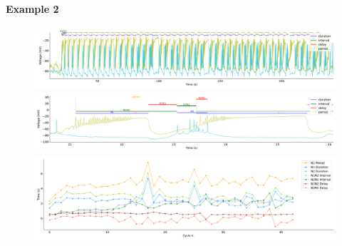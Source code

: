 \paragraph{\large{Example 2}}


\begin{figure}[htbp]
	\centering
	\begin{minipage}[b]{\textwidth}
		\centering
		\includegraphics[width=\textwidth,height=0.1\textheight]{./invariants/data/SUSSEX/CV1a_driven2/images/stim_cv1a2_signal_intervals_zoom.pdf}
		\includegraphics[width=\textwidth]{./invariants/data/SUSSEX/CV1a_driven2/images/stim_cv1a2_signal_intervals_cycle.pdf}
		\includegraphics[width=\textwidth]{./invariants/data/SUSSEX/CV1a_driven2/images/stim_cv1a2_time_cycle.pdf}
	\end{minipage}
	\centering
	\begin{minipage}{0.9\textwidth}
		\begin{minipage}[b]{0.43\textwidth}
			\centering

\end{minipage}
\end{minipage}
\end{figure}
